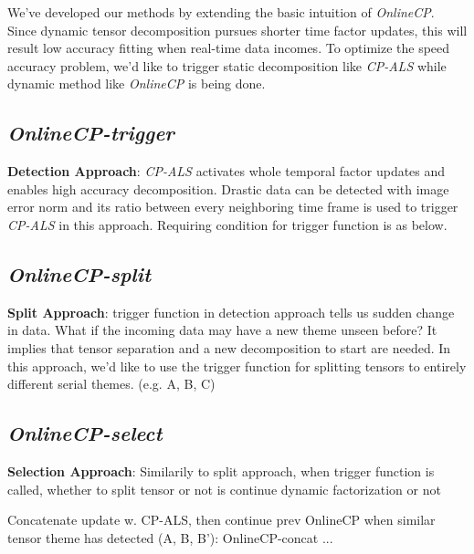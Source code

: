 We've developed our methods by extending the basic intuition of \textit{OnlineCP}. Since dynamic tensor decomposition pursues shorter time factor updates, this will result low accuracy fitting when real-time data incomes. To optimize the speed accuracy problem, we'd like to trigger static decomposition like \textit{CP-ALS} while dynamic method like \textit{OnlineCP} is being done.

\subsection{\em OnlineCP-trigger}
\textbf{Detection Approach}: \textit{CP-ALS} activates whole temporal factor updates and enables high accuracy decomposition. Drastic data can be detected with image error norm and its ratio between every neighboring time frame is used to trigger \textit{CP-ALS} in this approach. Requiring condition for trigger function is as below.

\subsection{\em OnlineCP-split}
\textbf{Split Approach}: trigger function in detection approach tells us sudden change in data. What if the incoming data may have a new theme unseen before? It implies that tensor separation and a new decomposition to start are needed. In this approach, we'd like to use the trigger function for splitting tensors to entirely different serial themes. (e.g. A, B, C)

\subsection{\em OnlineCP-select}
\textbf{Selection Approach}: Similarily to split approach, when trigger function is called, whether to split tensor or not is  continue dynamic factorization or not  

Concatenate  update w. CP-ALS, then continue prev OnlineCP when similar tensor theme has detected (A, B, B’): OnlineCP-concat
...